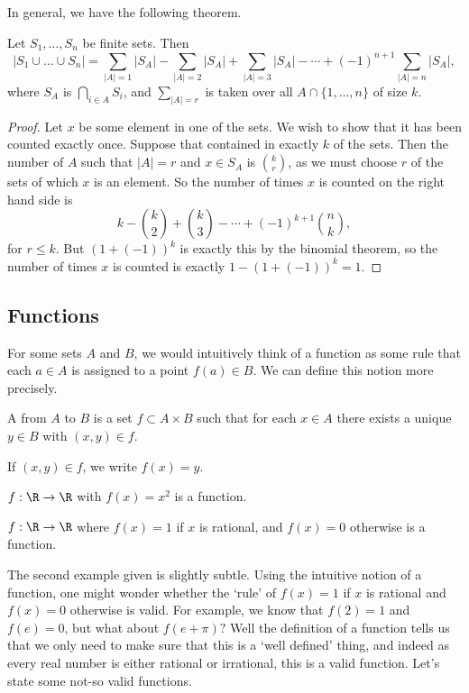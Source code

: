 In general, we have the following theorem.

\begin{theorem}
	Let $S_1, \dots, S_n$ be finite sets. Then
	$$
	|S_1 \cup \dots \cup S_n| = \sum_{|A| = 1} |S_A| - \sum_{|A| = 2} |S_A| + \sum_{|A| = 3} |S_A| - \cdots + (-1)^{n + 1} \sum_{|A| = n} |S_A|,
	$$
	where $S_A$ is $\bigcap_{i \in A} S_i$, and $\sum_{|A| = r}$ is taken over all $A \cap \{1, \dots, n\}$ of size $k$.
\end{theorem}
\begin{proof}
	Let $x$ be some element in one of the sets. We wish to show that it has been counted exactly once. Suppose that contained in exactly $k$ of the sets.
	Then the number of $A$ such that $|A| = r$ and $x \in S_A$ is $\binom{k}{r}$, as we must choose $r$ of the sets of which $x$ is an element.
	So the number of times $x$ is counted on the right hand side is
	$$
	k - \binom{k}{2} + \binom{k}{3} - \cdots + (-1)^{k + 1}\binom{n}{k},
	$$
	for $r \leq k$. But $(1 + (-1))^k$ is exactly this by the binomial theorem, so the number of times $x$ is counted is exactly $1 - (1 + (-1))^k = 1$.
\end{proof}

\subsection{Functions}

For some sets $A$ and $B$, we would intuitively think of a function as some rule that each $a \in A$ is assigned to a point $f(a) \in B$. We can define this notion more precisely.

\begin{definition}[Function]
	A  from $A$ to $B$ is a set $f \subset A \times B$ such that for each $x \in A$ there exists a unique $y \in B$ with $(x, y) \in f$.

	If $(x, y) \in f$, we write $f(x) = y$.
\end{definition}

\begin{example}
	$f: \R \rightarrow \R$ with $f(x) = x^2$ is a function.

	$f : \R \rightarrow \R$ where $f(x) = 1$ if $x$ is rational, and $f(x) = 0$ otherwise is a function.
\end{example}
The second example given is slightly subtle. Using the intuitive notion of a function, one might wonder whether the `rule' of $f(x) = 1$ if $x$ is rational and $f(x) = 0$ otherwise is valid. For example, we know that $f(2) = 1$ and $f(e) = 0$, but what about $f(e + \pi)?$ Well the definition of a function tells us that we only need to make sure that this is a `well defined' thing, and indeed as every real number is either rational or irrational, this is a valid function. Let's state some not-so valid functions.

